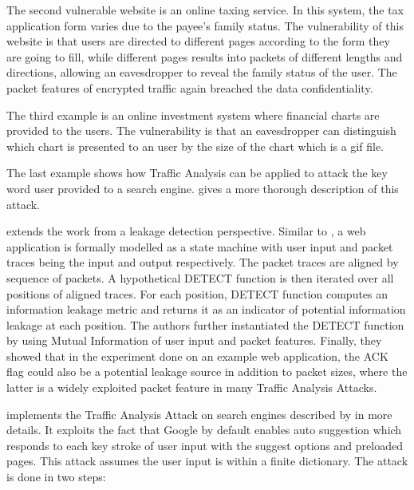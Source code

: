 \begin{example}
	The second vulnerable website is an online taxing service. In this system, the tax application form varies due to the payee's family status. The vulnerability of this website is that users are directed to different pages according to the form they are going to fill, while different pages results into packets of different lengths and directions, allowing an eavesdropper to reveal the family status of the user. The packet features of encrypted traffic again breached the data confidentiality.
\end{example}

\begin{example}
	The third example is an online investment system where financial charts are provided to the users. The vulnerability is that an eavesdropper can distinguish which chart is presented to an user by the size of the chart which is a gif file. 
\end{example}

\begin{example}
	The last example shows how Traffic Analysis can be applied to attack the key word user provided to a search engine. \cite{SearchAttack} gives a more thorough description of this attack.
\end{example}

\cite{PinpointWeb} extends the work from a leakage detection perspective. Similar to \cite{WebSideChannel}, a web application is formally modelled as a state machine with user input and packet traces being the input and output respectively. The packet traces are aligned by sequence of packets. A hypothetical DETECT function is then iterated over all positions of aligned traces. For each position, DETECT function computes an information leakage metric and returns it as an indicator of potential information leakage at each position. The authors further instantiated the DETECT function by using Mutual Information of user input and packet features. Finally, they showed that in the experiment done on an example web application, the ACK flag could also be a potential leakage source in addition to packet sizes, where the latter is a widely exploited packet feature in many Traffic Analysis Attacks.

\cite{SearchAttack} implements the Traffic Analysis Attack on search engines described by \cite{WebSideChannel} in more details. It exploits the fact that Google by default enables auto suggestion which responds to each key stroke of user input with the suggest options and preloaded pages. This attack assumes the user input is within a finite dictionary. The attack is done in two steps:

